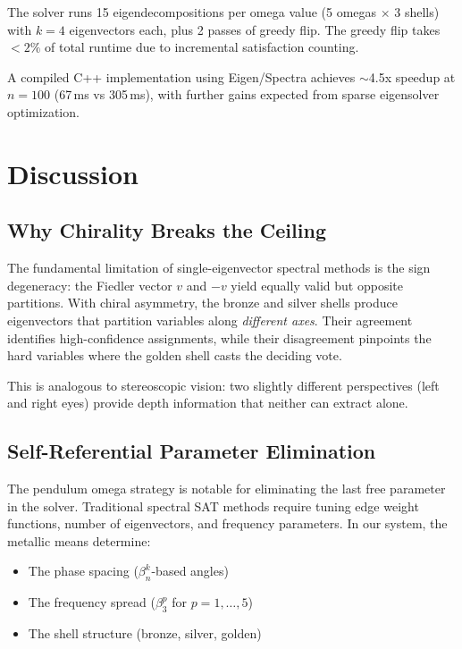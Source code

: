 \documentclass[11pt,a4paper]{article}
\begin{document}
The solver runs 15 eigendecompositions per omega value (5 omegas
$\times$ 3 shells) with $k=4$ eigenvectors each, plus 2 passes of
greedy flip. The greedy flip takes $<2\%$ of total runtime due to
incremental satisfaction counting.

A compiled C++ implementation using Eigen/Spectra achieves $\sim$4.5x
speedup at $n=100$ (67\,ms vs 305\,ms), with further gains expected from
sparse eigensolver optimization.

\section{Discussion}

\subsection{Why Chirality Breaks the Ceiling}

The fundamental limitation of single-eigenvector spectral methods is
the sign degeneracy: the Fiedler vector $v$ and $-v$ yield equally
valid but opposite partitions. With chiral asymmetry, the bronze and
silver shells produce eigenvectors that partition variables along
\emph{different axes}. Their agreement identifies high-confidence
assignments, while their disagreement pinpoints the hard variables
where the golden shell casts the deciding vote.

This is analogous to stereoscopic vision: two slightly different
perspectives (left and right eyes) provide depth information that
neither can extract alone.

\subsection{Self-Referential Parameter Elimination}

The pendulum omega strategy is notable for eliminating the last free
parameter in the solver. Traditional spectral SAT methods require
tuning edge weight functions, number of eigenvectors, and frequency
parameters. In our system, the metallic means determine:

\begin{itemize}[leftmargin=*]
\item The phase spacing ($\beta_n^k$-based angles)
\item The frequency spread ($\beta_3^p$ for $p=1,\ldots,5$)
\item The shell structure (bronze, silver, golden)
\end{itemize}
\end{document}
